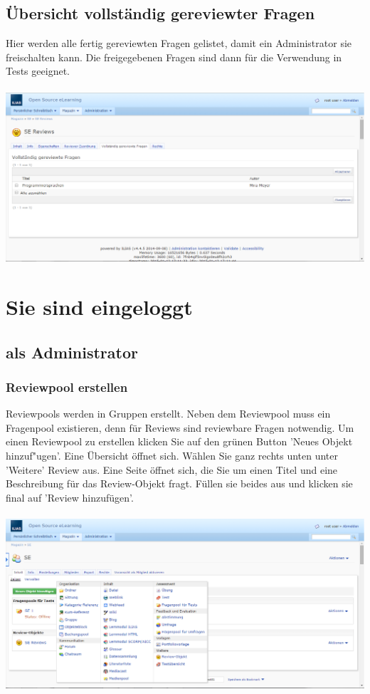 \documentclass[12pt,a4paper]{scrreprt}
\begin{document}
\section{Übersicht vollständig gereviewter Fragen}
Hier werden alle fertig gereviewten Fragen gelistet, damit ein Administrator sie freischalten kann. Die freigegebenen Fragen sind dann für die Verwendung in Tests geeignet. \\
\\
\includegraphics[width=1.0\textwidth]{frage_fertigstellen.png}

\chapter{Sie sind eingeloggt}

\section{als Administrator}
	
\subsection{Reviewpool erstellen}
Reviewpools werden in Gruppen erstellt. Neben dem Reviewpool muss ein Fragenpool existieren, denn für Reviews sind reviewbare Fragen notwendig. Um einen Reviewpool zu erstellen klicken Sie auf den grünen Button 'Neues Objekt hinzuf"ugen'. Eine Übersicht öffnet sich. Wählen Sie ganz rechts unten unter 'Weitere' Review aus. Eine Seite öffnet sich, die Sie um einen Titel und eine Beschreibung für das Review-Objekt fragt. Füllen sie beides aus und klicken sie final auf 'Review hinzufügen'.\\
\\
\includegraphics[width=1.0\textwidth]{reviewpool_erstellen.png}
		
\end{document}
